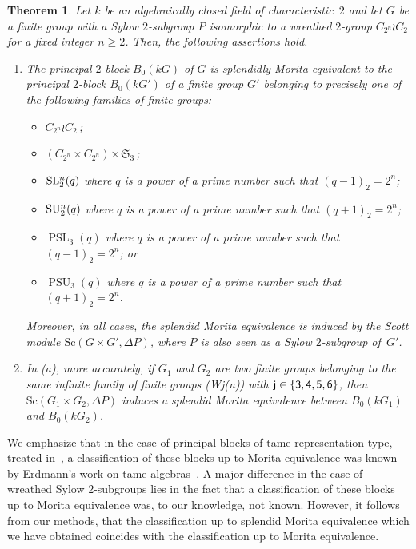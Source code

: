 \documentclass[12pt,a4paper]{amsart}
\theoremstyle{plain}\newtheorem{Theorem}{Theorem}[section]
\theoremstyle{plain}\newtheorem{Conjecture}[Theorem]{Conjecture}
\theoremstyle{plain}\newtheorem{Corollary}[Theorem]{Corollary}
\theoremstyle{plain}\newtheorem{Lemma}[Theorem]{Lemma}
\theoremstyle{plain}\newtheorem{Proposition}[Theorem]{Proposition}
\theoremstyle{definition}\newtheorem{Definition}[Theorem]{Definition}
\theoremstyle{definition}\newtheorem{Example}[Theorem]{Example}
\theoremstyle{definition}\newtheorem{Examples}[Theorem]{Examples}
\theoremstyle{definition}\newtheorem{Remark}[Theorem]{Remark}
\theoremstyle{definition}\newtheorem{Question}[Theorem]{Question}
\theoremstyle{definition}\newtheorem{Notation}[Theorem]{Notation}
\theoremstyle{definition}\newtheorem{Hypothesis}[Theorem]{Hypothesis}
\theoremstyle{definition}\newtheorem{Assumption}[Theorem]{Assumption}
\theoremstyle{definition}\newtheorem{Strategy}[Theorem]{Strategy}
\theoremstyle{definition}\newtheorem{Contents}[Theorem]{Contents}
\theoremstyle{definition}\newtheorem{Computations}[Theorem]{Computations}
\theoremstyle{definition}\newtheorem{Equivalences}[Theorem]{Equivalences}
\theoremstyle{definition}\newtheorem{Notation/Definition}[Theorem]{Notation/Definition}
\theoremstyle{definition}\newtheorem{noth}[Theorem]{}
\theoremstyle{plain}\newtheorem{Step}[Theorem]{Step}
\newcommand{\PSL}{\operatorname{PSL}}
\newcommand{\PSU}{\operatorname{PSU}}
\begin{document}
\begin{Theorem}\label{thm:MainResult}%
Let $k$ be an algebraically closed field of characteristic~$2$ and 
let $G$ be a finite group with a Sylow $2$-subgroup $P$ 
isomorphic to a wreathed $2$-group $C_{2^n}\wr C_2$ for a fixed integer $n\geq 2$. 
Then, the following assertions hold.
\begin{enumerate}[label={\rm(\alph*)}]
\item 
The principal $2$-block $B_0(kG)$ of $G$ is splendidly Morita equivalent to the
principal $2$-block $B_0(kG')$ of a finite group $G'$ belonging to precisely 
one of the following families of  finite groups:
\begin{itemize}[leftmargin=18mm]
\item[{\rm\sf (W1(n))}] $C_{2^n}\wr C_2$\,; 
\item[{\rm\sf (W2(n))}] $
(C_{2^n}\times C_{2^n})\rtimes \mathfrak S_3$\,;  
\item[{\rm\sf(W3(n))}]
${\mathrm{SL}}{\color{black}^n_2}(q)$ where  $q$ is a power of a prime number
such that  $(q-1)_2=2^n$;
\item[{\rm\sf (W4(n))}] ${\mathrm{SU}}{\color{black}^n_2}(q)$  where  
$q$ is a power of a prime number such that $(q+1)_2=2^n$; 
\item[{\rm\sf (W5(n))}] 
$\PSL_3(q)$   where  $q$ is a power of a prime number such that $(q-1)_2=2^n$; or
\item[{\rm\sf (W6(n))}] $\PSU_3(q)$  where  $q$ is a power of a prime number
such that $(q+1)_2=2^n$. 
\end{itemize}
Moreover, in all cases, the splendid Morita equivalence is induced by the
Scott module ${{\mathrm{Sc}}(G\times G', \Delta P)}$, where $P$ is also seen as a Sylow $2$-subgroup of~$G'$.
%
\item 
In {\rm(a)}, more accurately, if $G_1$ and $G_2$ are two finite groups belonging 
to the same infinite family of finite groups {\sf(Wj(n))} with ${\sf j}\in \{{\sf 3},{\sf 4},{\sf 5},{\sf 6}\}$,
then ${{\mathrm{Sc}}(G_{1}\times G_2, \Delta P)}$ induces a splendid Morita equivalence  between 
$B_0(kG_1)$ and $B_0(kG_2)$.
\end{enumerate} 
\end{Theorem} 


We emphasize that in the case of principal blocks of tame representation type, treated 
in~\cite{KL20a,KL20b,KLS20}, a classification of these blocks up to Morita equivalence 
was known by Erdmann's work on tame algebras~\cite{Erd90}. 
A major difference in the case of wreathed Sylow $2$-subgroups lies in the fact that
a classification of these blocks up to Morita equivalence was, to our knowledge, not known.
However, it follows from our methods, that the classification up to splendid Morita equivalence 
which we have obtained coincides with the classification up to Morita equivalence. 
\end{document}
